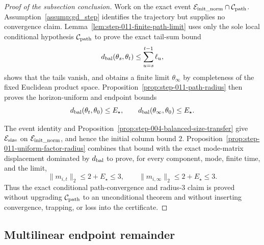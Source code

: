 \begin{proof}[Proof of the subsection conclusion]

Work on the exact event
\(\mathcal E_{\rm init\_norm}\cap\mathcal C_{\rm path}\).
Assumption~\ref{assump:gd_step} identifies the trajectory but supplies no
convergence claim. Lemma~\ref{lem:step-011-finite-path-limit} uses only the
sole local conditional hypothesis \(\mathcal C_{\rm path}\) to prove the exact
tail-sum bound
\[
  d_{\rm bal}(\theta_s,\theta_t)
  \le\sum_{u=s}^{t-1}\ell_u,
\]
shows that the tails vanish, and obtains a finite limit
\(\theta_\infty\) by completeness of the fixed Euclidean product space.
Proposition~\ref{prop:step-011-path-radius} then proves the horizon-uniform and
endpoint bounds
\[
  d_{\rm bal}(\theta_t,\theta_0)\le E_\star,
  \qquad
  d_{\rm bal}(\theta_\infty,\theta_0)\le E_\star.
\]

The event identity and Proposition~\ref{prop:step-004-balanced-size-transfer}
give \(\mathcal E_{\rm size}\) on \(\mathcal E_{\rm init\_norm}\), and hence
the initial column bound \(2\). Proposition~\ref{prop:step-011-uniform-factor-radius}
combines that bound with the exact mode-matrix displacement dominated by
\(d_{\rm bal}\) to prove, for every component, mode, finite time, and the
limit,
\[
  \|m_{i,t}\|_2\le2+E_\star\le3,
  \qquad
  \|m_{i,\infty}\|_2\le2+E_\star\le3.
\]
Thus the exact conditional path-convergence and radius-\(3\) claim is proved
without upgrading \(\mathcal C_{\rm path}\) to an unconditional theorem and
without inserting convergence, trapping, or loss into the certificate.

\end{proof}

\subsection{Multilinear endpoint remainder}\label{app:step-012}

